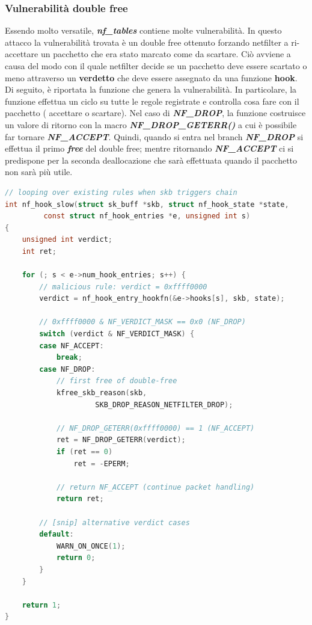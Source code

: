 \documentclass{article}
\begin{document}
\subsubsection{Vulnerabilità double free} Essendo molto versatile, \textbf{\textit{nf\_tables}} 
contiene molte vulnerabilità. In questo attacco la vulnerabilità trovata è un double free 
ottenuto forzando netfilter a ri-accettare un pacchetto che era stato marcato come da scartare. 
Ciò avviene a causa del modo con il quale netfilter decide se un pacchetto deve essere scartato o 
meno attraverso un \textbf{verdetto} che deve essere assegnato da una funzione \textbf{hook}. 
Di seguito, è riportata la funzione che genera la vulnerabilità. In particolare, la funzione 
effettua un ciclo su tutte le regole registrate e controlla cosa fare con il pacchetto (
accettare o scartare). Nel caso di \textbf{\textit{NF\_DROP}}, la funzione costruisce un 
valore di ritorno con la macro \textbf{\textit{NF\_DROP\_GETERR()}} a cui è possibile far 
tornare \textbf{\textit{NF\_ACCEPT}}. Quindi, quando si entra nel branch \textbf{\textit{NF\_DROP}}
si effettua il primo \textbf{\textit{free}} del double free; mentre ritornando \textbf{\textit{NF\_ACCEPT}}
ci si predispone per la seconda deallocazione che sarà effettuata quando il pacchetto non 
sarà più utile.

\begin{lstlisting}[language=C,caption="Funzione nf_hook_slow che genera la vulnerabilit"]
// looping over existing rules when skb triggers chain
int nf_hook_slow(struct sk_buff *skb, struct nf_hook_state *state,
         const struct nf_hook_entries *e, unsigned int s)
{
    unsigned int verdict;
    int ret;

    for (; s < e->num_hook_entries; s++) {
        // malicious rule: verdict = 0xffff0000
        verdict = nf_hook_entry_hookfn(&e->hooks[s], skb, state);  

        // 0xffff0000 & NF_VERDICT_MASK == 0x0 (NF_DROP)
        switch (verdict & NF_VERDICT_MASK) {  
        case NF_ACCEPT:
            break;
        case NF_DROP:
            // first free of double-free
            kfree_skb_reason(skb,
                     SKB_DROP_REASON_NETFILTER_DROP);  
            
            // NF_DROP_GETERR(0xffff0000) == 1 (NF_ACCEPT)
            ret = NF_DROP_GETERR(verdict);  
            if (ret == 0)
                ret = -EPERM;
            
            // return NF_ACCEPT (continue packet handling)
            return ret;  

        // [snip] alternative verdict cases
        default:
            WARN_ON_ONCE(1);
            return 0;
        }
    }

    return 1;
}
\end{lstlisting}
\end{document}
